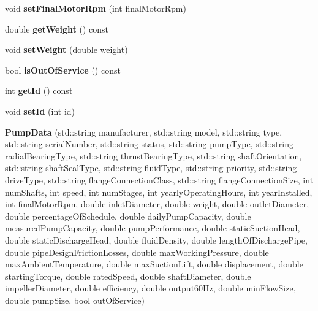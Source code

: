 \begin{DoxyCompactItemize}
\mbox{\label{class_pump_data_a74de5295a37ed747c8bb0ba95271b536}} 
void {\bfseries set\+Final\+Motor\+Rpm} (int final\+Motor\+Rpm)
\item 
\mbox{\label{class_pump_data_a2e6aa462389c9319292ef4002674d009}} 
double {\bfseries get\+Weight} () const
\item 
\mbox{\label{class_pump_data_a5cc20c9d33c7000da4cf15ee8b857504}} 
void {\bfseries set\+Weight} (double weight)
\item 
\mbox{\label{class_pump_data_a638acde0858b29b9a086cf4cc6e4f73f}} 
bool {\bfseries is\+Out\+Of\+Service} () const
\item 
\mbox{\label{class_pump_data_ac7e900bf6d6ebdffb375b4d913ae6a06}} 
int {\bfseries get\+Id} () const
\item 
\mbox{\label{class_pump_data_a99da1d2ca8416ecbf85fe662ff97db45}} 
void {\bfseries set\+Id} (int id)
\item 
\mbox{\label{class_pump_data_abe0be07293009588aaca7f99170780dd}} 
{\bfseries Pump\+Data} (std\+::string manufacturer, std\+::string model, std\+::string type, std\+::string serial\+Number, std\+::string status, std\+::string pump\+Type, std\+::string radial\+Bearing\+Type, std\+::string thrust\+Bearing\+Type, std\+::string shaft\+Orientation, std\+::string shaft\+Seal\+Type, std\+::string fluid\+Type, std\+::string priority, std\+::string drive\+Type, std\+::string flange\+Connection\+Class, std\+::string flange\+Connection\+Size, int num\+Shafts, int speed, int num\+Stages, int yearly\+Operating\+Hours, int year\+Installed, int final\+Motor\+Rpm, double inlet\+Diameter, double weight, double outlet\+Diameter, double percentage\+Of\+Schedule, double daily\+Pump\+Capacity, double measured\+Pump\+Capacity, double pump\+Performance, double static\+Suction\+Head, double static\+Discharge\+Head, double fluid\+Density, double length\+Of\+Discharge\+Pipe, double pipe\+Design\+Friction\+Losses, double max\+Working\+Pressure, double max\+Ambient\+Temperature, double max\+Suction\+Lift, double displacement, double starting\+Torque, double rated\+Speed, double shaft\+Diameter, double impeller\+Diameter, double efficiency, double output60\+Hz, double min\+Flow\+Size, double pump\+Size, bool out\+Of\+Service)

\end{DoxyCompactItemize}
